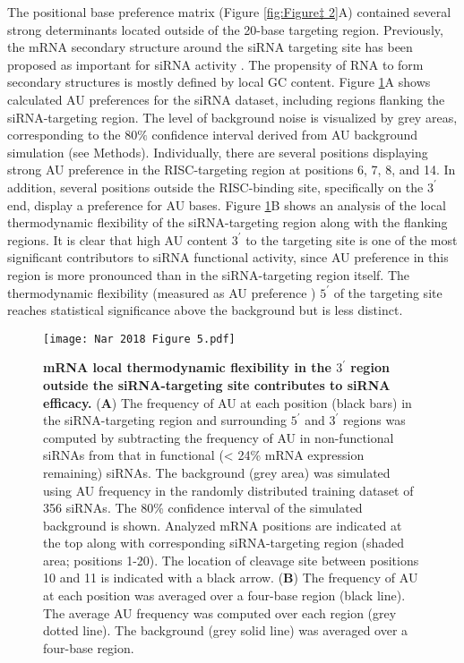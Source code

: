 \documentclass{report}
\begin{document}
The positional base preference matrix (Figure \ref{fig:Figure‡ 2}A) contained several strong determinants located outside of the 20-base targeting region. Previously, the mRNA secondary structure around the siRNA targeting site has been proposed as important for siRNA activity \cite{gredell_impact_2008, liu_effect_2013, tafer_impact_2008}. The propensity of RNA to form secondary structures is mostly defined by local GC content. Figure \ref{fig:Figure‡ 5}A shows calculated AU preferences for the siRNA dataset, including regions flanking the siRNA-targeting region. The level of background noise is visualized by grey areas, corresponding to the $80\%$  confidence interval derived from AU background simulation (see Methods). Individually, there are several positions displaying strong AU preference in the RISC-targeting region at positions 6, 7, 8, and 14. In addition, several positions outside the RISC-binding site, specifically on the $3^\prime$ end, display a preference for AU bases. Figure \ref{fig:Figure‡ 5}B shows an analysis of the local thermodynamic flexibility of the siRNA-targeting region along with the flanking regions. It is clear that high AU content $3^\prime$ to the targeting site is one of the most significant contributors to siRNA functional activity, since AU preference in this region is more pronounced than in the siRNA-targeting region itself. The thermodynamic flexibility (measured as AU preference \cite{khvorova_functional_2003}) $5^\prime$ of the targeting site reaches statistical significance above the background but is less distinct.
\begin{figure}
    \centering
    \texttt{[image: Nar 2018 Figure 5.pdf]}
    \caption{\textbf{mRNA local thermodynamic flexibility in the $3^\prime$ region outside the siRNA-targeting site contributes to siRNA efficacy.} (\textbf{A}) The frequency of AU at each position (black bars) in the siRNA-targeting region and surrounding $5^\prime$ and $3^\prime$ regions was computed by subtracting the frequency of AU in non-functional siRNAs from that in functional (< 24\% mRNA expression remaining) siRNAs. The background (grey area) was simulated using AU frequency in the randomly distributed training dataset of 356 siRNAs. The 80\% confidence interval of the simulated background is shown. Analyzed mRNA positions are indicated at the top along with corresponding siRNA-targeting region (shaded area; positions 1-20). The location of cleavage site between positions 10 and 11 is indicated with a black arrow. (\textbf{B}) The frequency of AU at each position was averaged over a four-base region (black line). The average AU frequency was computed over each region (grey dotted line). The background (grey solid line) was averaged over a four-base region.}
    \label{fig:Figure‡ 5}
\end{figure}
\end{document}
